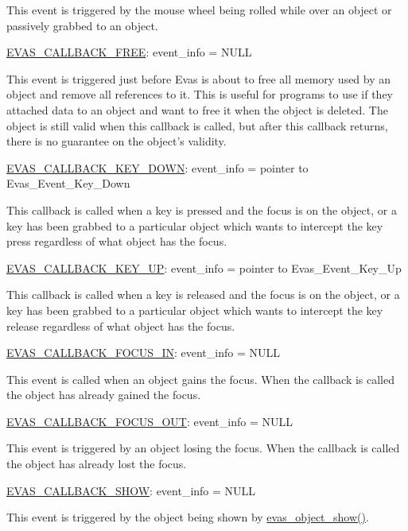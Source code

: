 This event is triggered by the mouse wheel being rolled while over an object or passively grabbed to an object.

\hyperlink{Evas_8h_a99e208e463a20499aabe6faac8a8cb8aaab869b5d534f02f1b3e151e2406a8c24}{EVAS\_\-CALLBACK\_\-FREE}: event\_\-info = NULL

This event is triggered just before Evas is about to free all memory used by an object and remove all references to it. This is useful for programs to use if they attached data to an object and want to free it when the object is deleted. The object is still valid when this callback is called, but after this callback returns, there is no guarantee on the object's validity.

\hyperlink{Evas_8h_a99e208e463a20499aabe6faac8a8cb8aa336b86bad4f145f84c155e4922335584}{EVAS\_\-CALLBACK\_\-KEY\_\-DOWN}: event\_\-info = pointer to Evas\_\-Event\_\-Key\_\-Down

This callback is called when a key is pressed and the focus is on the object, or a key has been grabbed to a particular object which wants to intercept the key press regardless of what object has the focus.

\hyperlink{Evas_8h_a99e208e463a20499aabe6faac8a8cb8aac436b50ad665089f8a24b0fb827cec5f}{EVAS\_\-CALLBACK\_\-KEY\_\-UP}: event\_\-info = pointer to Evas\_\-Event\_\-Key\_\-Up

This callback is called when a key is released and the focus is on the object, or a key has been grabbed to a particular object which wants to intercept the key release regardless of what object has the focus.

\hyperlink{Evas_8h_a99e208e463a20499aabe6faac8a8cb8aa819cf61e9d11012b7402338c2ccb7b97}{EVAS\_\-CALLBACK\_\-FOCUS\_\-IN}: event\_\-info = NULL

This event is called when an object gains the focus. When the callback is called the object has already gained the focus.

\hyperlink{Evas_8h_a99e208e463a20499aabe6faac8a8cb8aab26a0af7efaa8b77e996bd438accf8d3}{EVAS\_\-CALLBACK\_\-FOCUS\_\-OUT}: event\_\-info = NULL

This event is triggered by an object losing the focus. When the callback is called the object has already lost the focus.

\hyperlink{Evas_8h_a99e208e463a20499aabe6faac8a8cb8aab433c293bd272670ac3b5e8b1928a540}{EVAS\_\-CALLBACK\_\-SHOW}: event\_\-info = NULL

This event is triggered by the object being shown by \hyperlink{group__Evas__Object__Group__Basic_ga769ad9a3e3daecb7a828196a2c86332f}{evas\_\-object\_\-show()}.

